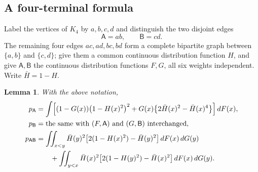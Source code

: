 \documentclass[10pt,a4paper]{amsart}
\newtheorem{lemma}[theorem]{Lemma}
\begin{document}
\subsection{A four-terminal formula}

Label the vertices of $K_4$ by $a,b,c,d$ and distinguish the two disjoint edges
\[
\mathsf A=ab,\qquad \mathsf B=cd .
\]
The remaining four edges $ac,ad,bc,bd$ form a complete bipartite graph between
$\{a,b\}$ and $\{c,d\}$; give them a common continuous distribution function $H$,
and give $\mathsf A,\mathsf B$ the continuous distribution functions $F,G$, all
six weights independent. Write $\bar H=1-H$.

\begin{lemma}
\label{lem:fourterminal}
With the above notation,
\begin{align}
p_{\mathsf A}&=\int\Bigl[(1-G(x))\bigl(1-H(x)^2\bigr)^2
   +G(x)\bigl\{2\bar H(x)^2-\bar H(x)^4\bigr\}\Bigr]\,dF(x),
\label{eq:pA}\\
p_{\mathsf B}&=\text{the same with }(F,\mathsf A)\text{ and }(G,\mathsf B)
   \text{ interchanged},
\label{eq:pB}\\
p_{\mathsf{AB}}&=\iint_{x<y}\bar H(y)^2\bigl[2(1-H(x)^2)-\bar H(y)^2\bigr]
   \,dF(x)\,dG(y)\notag\\
&\qquad{}+\iint_{y<x}\bar H(x)^2\bigl[2(1-H(y)^2)-\bar H(x)^2\bigr]
   \,dF(x)\,dG(y).
\label{eq:pAB}
\end{align}
\end{lemma}
\end{document}
